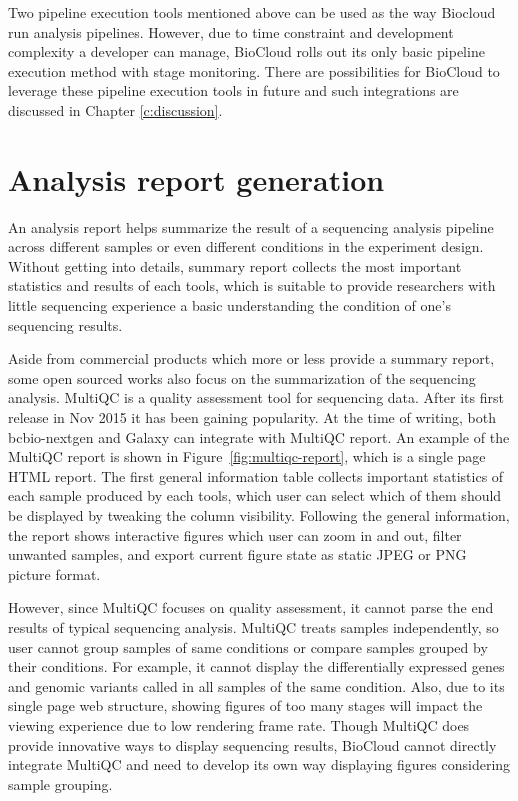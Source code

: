 Two pipeline execution tools mentioned above can be used as the way Biocloud
run analysis pipelines. However, due to time constraint and development
complexity a developer can manage, BioCloud rolls out its only basic pipeline
execution method with stage monitoring. There are possibilities for BioCloud to
leverage these pipeline execution tools in future and such integrations are
discussed in Chapter \ref{c:discussion}.


\section{Analysis report generation}

An analysis report helps summarize the result of a sequencing analysis pipeline
across different samples or even different conditions in the experiment design.
Without getting into details, summary report collects the most important
statistics and results of each tools, which is suitable to provide researchers
with little sequencing experience a basic understanding the condition of one's
sequencing results.

Aside from commercial products which more or less provide a summary report,
some open sourced works also focus on the summarization of the sequencing
analysis. MultiQC \cite{ewels2016:multiqc} is a quality assessment tool for
sequencing data. After its first release in Nov 2015 it has been gaining
popularity. At the time of writing, both bcbio-nextgen and Galaxy can integrate
with MultiQC report. An example of the MultiQC report is shown in
Figure~\ref{fig:multiqc-report}, which is a single page HTML report. The first
general information table collects important statistics of each sample produced
by each tools, which user can select which of them should be displayed by
tweaking the column visibility. Following the general information, the report
shows interactive figures which user can zoom in and out, filter unwanted
samples, and export current figure state as static JPEG or PNG picture format.

However, since MultiQC focuses on quality assessment, it cannot parse the end
results of typical sequencing analysis. MultiQC treats samples independently,
so user cannot group samples of same conditions or compare samples grouped by
their conditions. For example, it cannot display the differentially expressed
genes and genomic variants called in all samples of the same condition. Also,
due to its single page web structure, showing figures of too many stages will
impact the viewing experience due to low rendering frame rate. Though MultiQC
does provide innovative ways to display sequencing results, BioCloud cannot
directly integrate MultiQC and need to develop its own way displaying figures
considering sample grouping.



